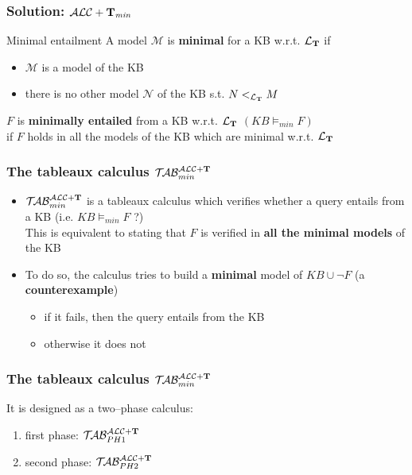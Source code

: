 \documentclass[serif,mathserif]{beamer}
\newcommand{\tip}{{\bf T}}
\newcommand{\alctmin}{\mathcal{ALC}+\tip_{\mbox{\scriptsize \em min}}}
\newcommand{\nuovoc}{\mathrel{{\mathcal{T}\!\mathcal{AB}}}_{min}^{\mathcal{ALC}+\mbox{\scriptsize $\tip$}}}
\newcommand{\primo}{\mathrel{{\mathcal{T}\!\mathcal{AB}}}_{\scriptsize PH 1}^{\mathcal{ALC}+\mbox{\scriptsize $\tip$}}}
\newcommand{\secondo}{\mathrel{{\mathcal{T}\!\mathcal{AB}}}_{\scriptsize PH 2}^{\mathcal{ALC}+\mbox{\scriptsize $\tip$}}}
\newcommand{\LT}{\mathcal{L_\tip}}
\begin{document}
\begin{frame}
	\frametitle{Solution: $\alctmin$}
	\begin{block}{Minimal entailment}
	A model $\mathcal{M}$ is \textbf{minimal} for a KB w.r.t. $\LT$ if
		\begin{itemize}
		\item $\mathcal{M}$ is a model of the KB
		\item there is no other model $\mathcal{N}$ of the KB s.t. $N <_\LT M$\\[0.5cm]
		\end{itemize}
		$F$ is \textbf{minimally entailed} from a KB w.r.t. $\LT$ \alert{$(KB \models_{min} F)$}\\[0.1cm]
		if $F$ holds in all the models of the KB which are minimal w.r.t. $\LT$
	\end{block}
\end{frame}


\begin{frame}
	\frametitle{The tableaux calculus $\nuovoc$}
	\begin{itemize}
	\item $\nuovoc$ is a tableaux calculus which 
	verifies whether a query entails from a KB (i.e. $KB \models_{min} F$ ?)\\[0.3cm]
	This is equivalent to stating that $F$ is verified in \textbf{all the minimal models} of the KB\\[0.3cm]
	\item To do so, the calculus tries to build a \textbf{minimal} model of $KB \cup \neg F$ (a \textbf{counterexample})
		\begin{itemize}
		\item if it fails, then the query entails from the KB
		\item otherwise it does not
		\end{itemize}
	\end{itemize}
\end{frame}

\begin{frame}
	\frametitle{The tableaux calculus $\nuovoc$}
 It is designed as a two--phase calculus:
		\begin{enumerate}
		\item first phase: $\primo$ 	
		\item second phase: $\secondo$	
		\end{enumerate}	

\end{frame}
\end{document}
